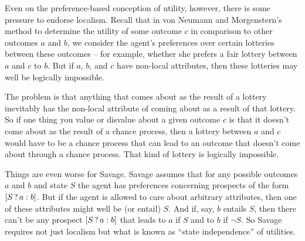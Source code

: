 

Even on the preference-based conception of utility, however, there is
some pressure to endorse localism. Recall that in von Neumann and
Morgenstern's method to determine the utility of some outcome $c$ in
comparison to other outcomes $a$ and $b$, we consider the agent's
preferences over certain lotteries between these outcomes -- for
example, whether she prefers a fair lottery between $a$ and $c$ to
$b$. But if $a$, $b$, and $c$ have non-local attributes, then these
lotteries may well be logically impossible.

The problem is that anything that comes about as the result of a
lottery inevitably has the non-local attribute of coming about as a
result of that lottery. So if one thing you value or disvalue about a
given outcome $c$ is that it doesn't come about as the result of a
chance process, then a lottery between $a$ and $c$ would have to be a
chance process that can lead to an outcome that doesn't come about
through a chance process. That kind of lottery is logically
impossible.

Things are even worse for Savage. Savage assumes that for any possible
outcomes $a$ and $b$ and state $S$ the agent has preferences
concerning prospects of the form $[S\,?\, a :b]$. But if the agent is
allowed to care about arbitrary attributes, then one of these
attributes might well be (or entail) $S$. And if, say, $b$ entails
$S$, then there can't be any prospect $[S\,?\, a :b]$ that leads to
$a$ if $S$ and to $b$ if $\neg S$. So Savage requires not just
localism but what is known as  ``state independence'' of utilities.



